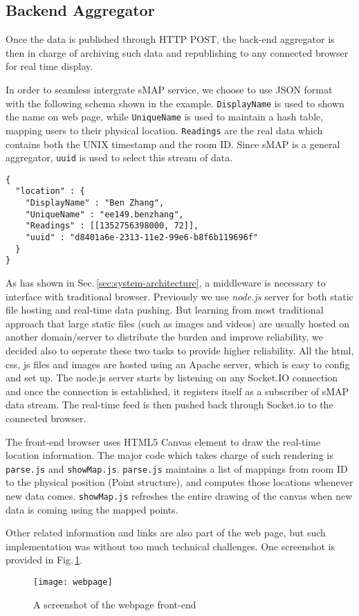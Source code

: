 \subsection{Backend Aggregator}
\label{sec:backend-aggregator}
Once the data is published through HTTP POST, the back-end aggregator is then in charge of archiving such data and republishing to any connected browser for real time display. 

In order to seamless intergrate sMAP service, we choose to use JSON format with the following schema shown in the example. \texttt{DisplayName} is used to shown the name on web page, while \texttt{UniqueName} is used to maintain a hash table, mapping users to their physical location. \texttt{Readings} are the real data which contains both the UNIX timestamp and the room ID. Since sMAP is a general aggregator, \texttt{uuid} is used to select this stream of data.
\begin{lstlisting}
{
  "location" : {
    "DisplayName" : "Ben Zhang",
    "UniqueName" : "ee149.benzhang",
    "Readings" : [[1352756398000, 72]],
    "uuid" : "d8401a6e-2313-11e2-99e6-b8f6b119696f"
  }
}
\end{lstlisting}

As has shown in Sec.\,\ref{sec:system-architecture}, a middleware is necessary to interface with traditional browser. Previously we use {\em node.js} server for both static file hosting and real-time data pushing. But learning from most traditional approach that large static files (such as images and videos) are usually hosted on another domain/server to distribute the burden and improve reliability, we decided also to seperate these two tasks to provide higher reliability. All the html, css, js files and images are hosted using an Apache server, which is easy to config and set up. The node.js server starts by listening on any Socket.IO connection and once the connection is established, it registers itself as a subscriber of sMAP data stream. The real-time feed is then pushed back through Socket.io to the connected browser.

The front-end browser uses HTML5 Canvas element to draw the real-time location information. The major code which takes charge of such rendering is \texttt{parse.js} and \texttt{showMap.js}. \texttt{parse.js} maintains a list of mappings from room ID to the physical position (Point structure), and computes those locations whenever new data comes. \texttt{showMap.js} refreshes the entire drawing of the canvas when new data is coming using the mapped points. 

Other related information and links are also part of the web page, but such implementation was without too much technical challenges. One screenshot is provided in Fig.\,\ref{fig:webpage}.
\begin{figure}
  \centering
  \texttt{[image: webpage]}
  \caption{A screenshot of the webpage front-end}
  \label{fig:webpage}
\end{figure}


